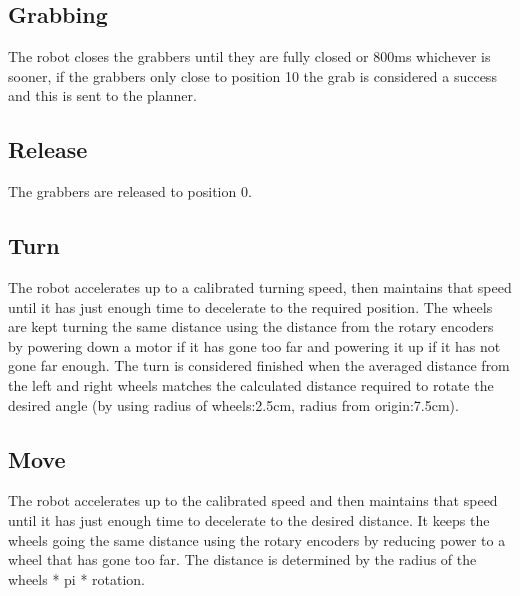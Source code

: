 \documentclass[a4paper]{article}
\begin{document}
\subsection{Grabbing}
The robot closes the grabbers until they are fully closed or 800ms whichever is sooner, if the grabbers only close to position 10 the grab is considered a success and this is sent to the planner. 
\subsection{Release}
The grabbers are released to position 0.
\subsection{Turn}
The robot accelerates up to a calibrated turning speed, then maintains that speed until it has just enough time to decelerate to the required position. The wheels are kept turning the same distance using the distance from the rotary encoders by powering down a motor if it has gone too far and powering it up if it has not gone far enough. The turn is considered finished when the averaged distance from the left and right wheels matches the calculated distance required to rotate the desired angle (by using radius of wheels:2.5cm, radius from origin:7.5cm). 
\subsection{Move}
The robot accelerates up to the calibrated speed and then maintains that speed until it has just enough time to decelerate to the desired distance. It keeps the wheels going the same distance using the rotary encoders by reducing power to a wheel that has gone too far. The distance is determined by the radius of the wheels * pi * rotation. 
\end{document}
